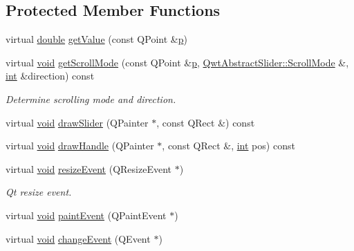 \subsection*{Protected Member Functions}
\begin{DoxyCompactItemize}
\item 
virtual \hyperlink{_super_l_u_support_8h_a8956b2b9f49bf918deed98379d159ca7}{double} \hyperlink{class_qwt_slider_a9dce1bf10fdcd92feae56dd77a455358}{get\-Value} (const Q\-Point \&\hyperlink{glext_8h_aa5367c14d90f462230c2611b81b41d23}{p})
\item 
virtual \hyperlink{group___u_a_v_objects_plugin_ga444cf2ff3f0ecbe028adce838d373f5c}{void} \hyperlink{class_qwt_slider_aea81bd1a595840a9eb0eb46254366110}{get\-Scroll\-Mode} (const Q\-Point \&\hyperlink{glext_8h_aa5367c14d90f462230c2611b81b41d23}{p}, \hyperlink{class_qwt_abstract_slider_ae4c0c4844ac6a35356f3c529a8eae154}{Qwt\-Abstract\-Slider\-::\-Scroll\-Mode} \&, \hyperlink{ioapi_8h_a787fa3cf048117ba7123753c1e74fcd6}{int} \&direction) const 
\begin{DoxyCompactList}\small\item\em Determine scrolling mode and direction. \end{DoxyCompactList}\item 
virtual \hyperlink{group___u_a_v_objects_plugin_ga444cf2ff3f0ecbe028adce838d373f5c}{void} \hyperlink{class_qwt_slider_a5e45e9ca42fdf659d89011bddd8ff779}{draw\-Slider} (Q\-Painter $\ast$, const Q\-Rect \&) const 
\item 
virtual \hyperlink{group___u_a_v_objects_plugin_ga444cf2ff3f0ecbe028adce838d373f5c}{void} \hyperlink{class_qwt_slider_a924e3fc8a885f72837379fdc29da2d20}{draw\-Handle} (Q\-Painter $\ast$, const Q\-Rect \&, \hyperlink{ioapi_8h_a787fa3cf048117ba7123753c1e74fcd6}{int} pos) const 
\item 
virtual \hyperlink{group___u_a_v_objects_plugin_ga444cf2ff3f0ecbe028adce838d373f5c}{void} \hyperlink{class_qwt_slider_a1f65d6ce5f8ed94e0a632edcd68a51f9}{resize\-Event} (Q\-Resize\-Event $\ast$)
\begin{DoxyCompactList}\small\item\em Qt resize event. \end{DoxyCompactList}\item 
virtual \hyperlink{group___u_a_v_objects_plugin_ga444cf2ff3f0ecbe028adce838d373f5c}{void} \hyperlink{class_qwt_slider_a128624c8babc95f5a631dfe3112d2d2b}{paint\-Event} (Q\-Paint\-Event $\ast$)
\item 
virtual \hyperlink{group___u_a_v_objects_plugin_ga444cf2ff3f0ecbe028adce838d373f5c}{void} \hyperlink{class_qwt_slider_a89e8ecbeb21511a88016e31aa5c12a58}{change\-Event} (Q\-Event $\ast$)

\end{DoxyCompactItemize}
